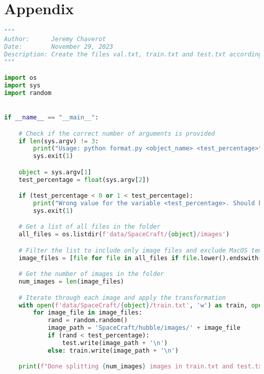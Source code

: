 \chapter{Appendix}

\begin{lstlisting}[language=Python, label=lst:1, caption=Python script \texttt{format.py} to randomly generate the training set and the test set based on a specified probability. Should be run from Gen6D's root folder.]
"""
Author:      Jeremy Chaverot
Date:        November 29, 2023
Description: Create the files val.txt, train.txt and test.txt according to a test percentage
"""

import os
import sys
import random


if __name__ == "__main__":

	# Check if the correct number of arguments is provided
    if len(sys.argv) != 3:
        print("Usage: python format.py <object_name> <test_percentage>")
        sys.exit(1)

    object = sys.argv[1]
    test_percentage = float(sys.argv[2])

    if (test_percentage < 0 or 1 < test_percentage):
        print("Wrong value for the variable <test_percentage>. Should be between 0 and 1 included.")
        sys.exit(1)

    # Get a list of all files in the folder
    all_files = os.listdir(f'data/SpaceCraft/{object}/images')

    # Filter the list to include only image files and exclude MacOS temporary files
    image_files = [file for file in all_files if file.lower().endswith(('.jpg')) and not file.startswith('._')]

    # Get the number of images in the folder
    num_images = len(image_files)

    # Iterate through each image and apply the transformation
    with open(f'data/SpaceCraft/{object}/train.txt', 'w') as train, open(f'data/SpaceCraft/{object}/test.txt', 'w') as test:
        for image_file in image_files:
            rand = random.random()
            image_path = 'SpaceCraft/hubble/images/' + image_file
            if (rand < test_percentage):
                test.write(image_path + '\n')
            else: train.write(image_path + '\n')

    print(f"Done splitting {num_images} images in train.txt and test.txt")
\end{lstlisting}

\bigskip

